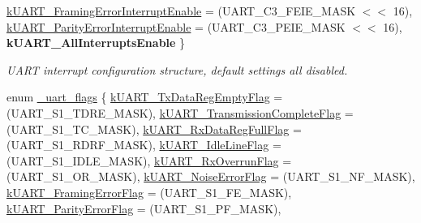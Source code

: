 \begin{DoxyCompactItemize}
\mbox{\hyperlink{group__uart__driver_gga700f3cd8e3800273a1591307cab6311ca00a387446d0ca7fd843968eca8af22a5}{k\+U\+A\+R\+T\+\_\+\+Framing\+Error\+Interrupt\+Enable}} = (U\+A\+R\+T\+\_\+\+C3\+\_\+\+F\+E\+I\+E\+\_\+\+M\+A\+SK $<$$<$ 16), 
\newline
\mbox{\hyperlink{group__uart__driver_gga700f3cd8e3800273a1591307cab6311cadc2475fa65313c6f1d13b36f0443b20a}{k\+U\+A\+R\+T\+\_\+\+Parity\+Error\+Interrupt\+Enable}} = (U\+A\+R\+T\+\_\+\+C3\+\_\+\+P\+E\+I\+E\+\_\+\+M\+A\+SK $<$$<$ 16), 
{\bfseries k\+U\+A\+R\+T\+\_\+\+All\+Interrupts\+Enable}
 \}
\begin{DoxyCompactList}\small\item\em U\+A\+RT interrupt configuration structure, default settings all disabled. \end{DoxyCompactList}\item 
enum \mbox{\hyperlink{group__uart__driver_ga259a53f363288115306a45d08fc66eb8}{\+\_\+uart\+\_\+flags}} \{ \newline
\mbox{\hyperlink{group__uart__driver_gga259a53f363288115306a45d08fc66eb8a5209c671b2f2f064dc512655387e9e1a}{k\+U\+A\+R\+T\+\_\+\+Tx\+Data\+Reg\+Empty\+Flag}} = (U\+A\+R\+T\+\_\+\+S1\+\_\+\+T\+D\+R\+E\+\_\+\+M\+A\+SK), 
\mbox{\hyperlink{group__uart__driver_gga259a53f363288115306a45d08fc66eb8a4468b60b2d78c34b93c9199df9e95d3a}{k\+U\+A\+R\+T\+\_\+\+Transmission\+Complete\+Flag}} = (U\+A\+R\+T\+\_\+\+S1\+\_\+\+T\+C\+\_\+\+M\+A\+SK), 
\mbox{\hyperlink{group__uart__driver_gga259a53f363288115306a45d08fc66eb8aa86a34b2ea609eeeb63f98fea498e540}{k\+U\+A\+R\+T\+\_\+\+Rx\+Data\+Reg\+Full\+Flag}} = (U\+A\+R\+T\+\_\+\+S1\+\_\+\+R\+D\+R\+F\+\_\+\+M\+A\+SK), 
\mbox{\hyperlink{group__uart__driver_gga259a53f363288115306a45d08fc66eb8ab2fc4e1b1164ed3e3fe7e19a39029b2c}{k\+U\+A\+R\+T\+\_\+\+Idle\+Line\+Flag}} = (U\+A\+R\+T\+\_\+\+S1\+\_\+\+I\+D\+L\+E\+\_\+\+M\+A\+SK), 
\newline
\mbox{\hyperlink{group__uart__driver_gga259a53f363288115306a45d08fc66eb8a93d3c56466b4656dcce08d9323d7afd8}{k\+U\+A\+R\+T\+\_\+\+Rx\+Overrun\+Flag}} = (U\+A\+R\+T\+\_\+\+S1\+\_\+\+O\+R\+\_\+\+M\+A\+SK), 
\mbox{\hyperlink{group__uart__driver_gga259a53f363288115306a45d08fc66eb8abd56419f102fb01c7bbc2c38f81ab360}{k\+U\+A\+R\+T\+\_\+\+Noise\+Error\+Flag}} = (U\+A\+R\+T\+\_\+\+S1\+\_\+\+N\+F\+\_\+\+M\+A\+SK), 
\mbox{\hyperlink{group__uart__driver_gga259a53f363288115306a45d08fc66eb8aade5071fa56646adcda3562051443868}{k\+U\+A\+R\+T\+\_\+\+Framing\+Error\+Flag}} = (U\+A\+R\+T\+\_\+\+S1\+\_\+\+F\+E\+\_\+\+M\+A\+SK), 
\mbox{\hyperlink{group__uart__driver_gga259a53f363288115306a45d08fc66eb8a0c92973ab1d527115fa01934c62a053d}{k\+U\+A\+R\+T\+\_\+\+Parity\+Error\+Flag}} = (U\+A\+R\+T\+\_\+\+S1\+\_\+\+P\+F\+\_\+\+M\+A\+SK), 

\end{DoxyCompactItemize}
